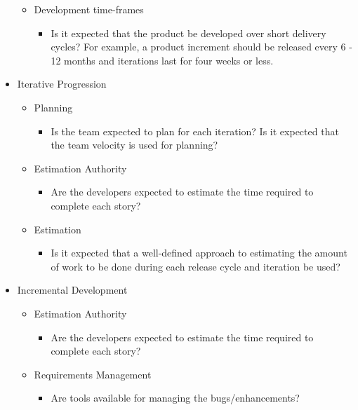 \begin{appendices}
\begin{itemize}
\begin{itemize}
			\item Development time-frames
				\begin{itemize}
					\item Is it expected that the product be developed over short delivery cycles? For example, a product increment should be released every 6 - 12 months and iterations last for four weeks or less.
				\end{itemize}
		\end{itemize}
	\item Iterative Progression
		\begin{itemize}
			\item Planning
				\begin{itemize}
					\item Is the team expected to plan for each iteration?
					\addition Is it expected that the team velocity is used for planning?
				\end{itemize}
			\item Estimation Authority
				\begin{itemize}
					\item Are the developers expected to estimate the time required to complete each story?
				\end{itemize}
			\item Estimation
				\begin{itemize}
					\item Is it expected that a well-defined approach to estimating the amount of work to be done during each release cycle and iteration be used?
				\end{itemize}
		\end{itemize}
	\item Incremental Development
		\begin{itemize}
			\item Estimation Authority
				\begin{itemize}
					\item Are the developers expected to estimate the time required to complete each story?
				\end{itemize}
			\item Requirements Management
				\begin{itemize}
					\item Are tools available for managing the bugs/enhancements?
				\end{itemize}

\end{itemize}
\end{itemize}
\end{appendices}
